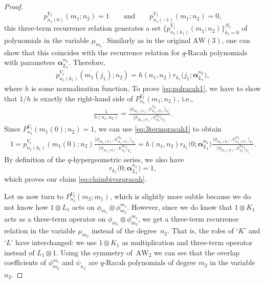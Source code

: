\documentclass[pdftex]{sigma}
\numberwithin{equation}{section}
\newcommand{\aw}{\mathrm{AW}\!\left(3\right)}
\newcommand{\AW}[1]{\mathrm{AW}_{#1}}
\begin{document}
\begin{proof}
	\[
	p_{n_1(0)}^{V_1}(m_1;n_2)=1 \qquad \text{and}\qquad p_{n_1(-1)}^{V_1}(m_1;n_2)=0,
	\]
	this three-term recurrence relation generates a set $\big\{p_{n_1(k_1)}^{V_1}(m_1;n_2)\big\}_{k_1=0}^{N_1}$ of polynomials in the variable $\mu_{m_1}$. Similarly as in the original $\aw$, one can show that this coincides with the recurrence relation for $q$-Racah polynomials with parameters $\bm{\alpha}_{L_1}^{n_2}$. Therefore,
	\begin{gather}
		p_{n_1(k_1)}^{V_1}(m_1(j_1);n_2)=h(n_1,n_2)r_{k_1}\big(j_1;\bm{\alpha}_{L_1}^{n_2}\big),\label{eq:3termqracah1}
	\end{gather}
	where $h$ is some normalization function. To prove \eqref{eq:polracah1}, we have to show that $1/h$ is exactly the right-hand side of $P_{n_1}^{V_1}(m_1;n_2)$, i.e.,
	\begin{gather}
		\frac{1}{h(n_1,n_2)}=\frac{\big\langle \phi_{m_1(0)},\psi_{n_1(0)}^{n_2}\big\rangle _{V_1}}{\big\langle \phi_{m_1(0)},\psi_{n_1}^{n_2}\big\rangle _{V_1}}.\label{eq:claimbivarqracah}
	\end{gather}
	Since $P_{n_1}^{V_1}(m_1(0);n_2)=1$, we can use \eqref{eq:3termqracah1} to obtain
	\begin{gather*}
		1=p_{n_1(k_1)}^{V_1}(m_1(0);n_2)\frac{\big\langle \phi_{m_1(0)},\psi_{n_1(0)}^{n_2}\big\rangle _{V_1}}{\big\langle \phi_{m_1(0)},\psi_{n_1}^{n_2}\big\rangle _{V_1}} = h(n_1,n_2)r_{k_1}\big(0;\bm{\alpha}_{L_1}^{n_2}\big)\frac{\big\langle \phi_{m_1(0)},\psi_{n_1(0)}^{n_2}\big\rangle _{V_1}}{\big\langle \phi_{m_1(0)},\psi_{n_1}^{n_2}\big\rangle _{V_1}}.
	\end{gather*}
	By definition of the $q$-hypergeometric series, we also have
	\[r_{k_1}\big(0;\bm{\alpha}_{L_1}^{n_2}\big)=1,\]
	which proves our claim \eqref{eq:claimbivarqracah}.
	
	Let us now turn to $P_{n_2}^{V_2}(m_2;m_1)$, which is slightly more subtle because we do not know how $1\otimes L_1$ acts on $\phi_{m_1}\otimes\phi_{m_2}^{m_1}$. However, since we do know that $1\otimes K_1$ acts as a three-term operator on $\phi_{m_1}\otimes\phi_{m_2}^{m_1}$, we get a three-term recurrence relation in the variable $\mu_{m_2}$ instead of the degree~$n_2$. That is, the roles of `$K$' and `$L$' have interchanged: we use $1\otimes K_1$ as multiplication and three-term operator instead of $L_1\otimes 1$. Using the symmetry of~$\AW{2}$ we can see that the overlap coefficients of $\phi_{m_2}^{m_1}$ and $\psi_{n_2}$ are $q$-Racah polynomials of degree $m_2$ in the variable $n_2$.
	

\end{proof}
\end{document}
